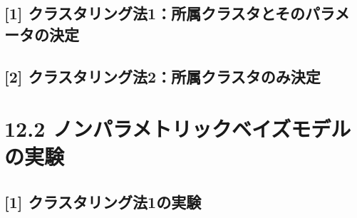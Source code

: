 \documentclass[10pt,fleqn]{beamer}
\begin{document}
    \subsection{[1] クラスタリング法1：所属クラスタとそのパラメータの決定}
    \subsection{[2] クラスタリング法2：所属クラスタのみ決定}
    \section{12.2 ノンパラメトリックベイズモデルの実験}
    \subsection{[1] クラスタリング法1の実験}
\end{document}
